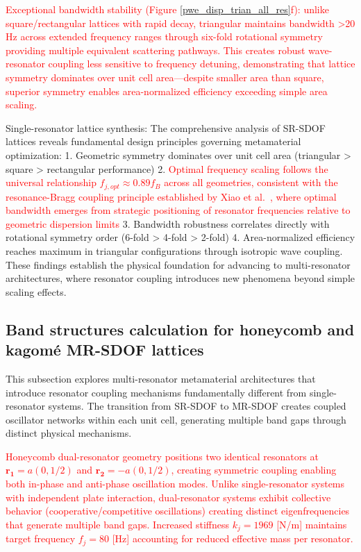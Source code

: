 \documentclass[review,numbers,sort&compress]{elsarticle}
\begin{document}
\textcolor{red}{Exceptional bandwidth stability (Figure \ref{pwe_disp_trian_all_res}f): unlike square/rectangular lattices with rapid decay, triangular maintains bandwidth >20 Hz across extended frequency ranges through six-fold rotational symmetry providing multiple equivalent scattering pathways. This creates robust wave-resonator coupling less sensitive to frequency detuning, demonstrating that lattice symmetry dominates over unit cell area---despite smaller area than square, superior symmetry enables area-normalized efficiency exceeding simple area scaling.}


Single-resonator lattice synthesis: The comprehensive analysis of SR-SDOF lattices reveals fundamental design principles governing metamaterial optimization:
1. Geometric symmetry dominates over unit cell area (triangular > square > rectangular performance)
2. \textcolor{red}{Optimal frequency scaling follows the universal relationship $f_{j,opt} \approx 0.89 f_B$ across all geometries, consistent with the resonance-Bragg coupling principle established by Xiao et al.~\cite{Xiao_2012}, where optimal bandwidth emerges from strategic positioning of resonator frequencies relative to geometric dispersion limits}
3. Bandwidth robustness correlates directly with rotational symmetry order (6-fold > 4-fold > 2-fold)
4. Area-normalized efficiency reaches maximum in triangular configurations through isotropic wave coupling.
These findings establish the physical foundation for advancing to multi-resonator architectures, where resonator coupling introduces new phenomena beyond simple scaling effects.


\subsection{Band structures calculation for honeycomb and kagomé MR-SDOF lattices}
\label{kh_disp_pwe}
This subsection explores multi-resonator metamaterial architectures that introduce resonator coupling mechanisms fundamentally different from single-resonator systems. The transition from SR-SDOF to MR-SDOF creates coupled oscillator networks within each unit cell, generating multiple band gaps through distinct physical mechanisms.

\textcolor{red}{Honeycomb dual-resonator geometry positions two identical resonators at \( \mathbf{r_1} = a(0, 1/2) \) and \( \mathbf{r_2} = -a(0, 1/2) \), creating symmetric coupling enabling both in-phase and anti-phase oscillation modes. Unlike single-resonator systems with independent plate interaction, dual-resonator systems exhibit collective behavior (cooperative/competitive oscillations) creating distinct eigenfrequencies that generate multiple band gaps. Increased stiffness \( k_j = 1969 \) [N/m] maintains target frequency \( f_j = 80 \) [Hz] accounting for reduced effective mass per resonator.}
\end{document}
